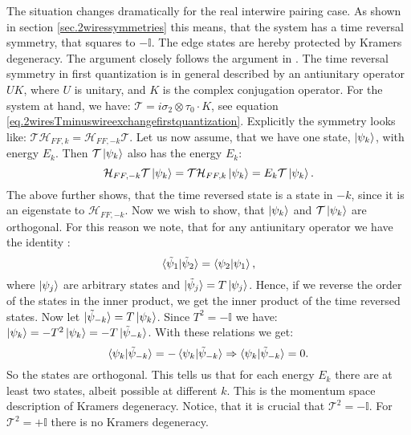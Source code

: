 The situation changes dramatically for the real interwire pairing case. As shown in section \ref{sec.2wiressymmetries} this means, that the system has a time reversal symmetry, that squares to $-\mathbb{I}$. The edge states are hereby protected by Kramers degeneracy. The argument closely follows the argument in \cite{BernevigTITSC}. The time reversal symmetry in first quantization is in general described by an antiunitary operator $UK$, where $U$ is unitary, and $K$ is the complex conjugation operator. For the system at hand, we have: $\mathcal{T} = i\sigma_2\otimes \tau_0\cdot K$, see equation \eqref{eq.2wiresTminuswireexchangefirstquantization}. Explicitly the symmetry looks like: $\mathcal{T}\mathcal{H}_{FF,k} = \mathcal{H}_{FF,-k}\mathcal{T}$. Let us now assume, that we have one state, $\ket{\psi_k}$, with energy $E_k$. Then $\mathcal{T}\ket{\psi_k}$ also has the energy $E_k$:
\begin{equation}
\mathcal{H}_{FF,-k}\mathcal{T}\ket{\psi_k} = \mathcal{T}\mathcal{H}_{FF,k}\ket{\psi_k} = E_k\mathcal{T}\ket{\psi_k}. \nonumber
\end{equation}
The above further shows, that the time reversed state is a state in $-k$, since it is an eigenstate to $\mathcal{H}_{FF,-k}$. Now we wish to show, that $\ket{\psi_k}$ and $\mathcal{T}\ket{\psi_k}$ are orthogonal. For this reason we note, that for any antiunitary operator we have the identity \cite{Sakurai, BernevigTITSC}:
\begin{equation}
\braket{\tilde{\psi}_1| \tilde{\psi}_2} = \braket{\psi_2|\psi_1}, \nonumber
\end{equation} 
where $\ket{\psi_j}$ are arbitrary states and $\ket{\tilde{\psi}_j} = T\ket{\psi_j}$. Hence, if we reverse the order of the states in the inner product, we get the inner product of the time reversed states. Now let $\ket{\tilde{\psi}_{-k}} = T\ket{\psi_k}$. Since $T^2 = - \mathbb{I}$ we have: $\ket{\psi_k} = -T^2\ket{\psi_k}= -T\ket{\tilde{\psi}_{-k}}$. With these relations we get:
\begin{equation}
\braket{\psi_k|\tilde{\psi}_{-k}} = -\braket{\psi_k|\tilde{\psi}_{-k}} \Rightarrow \braket{\psi_k|\tilde{\psi}_{-k}} = 0. 
\end{equation}
So the states are orthogonal. This tells us that for each energy $E_k$ there are at least two states, albeit possible at different $k$. This is the momentum space description of Kramers degeneracy. Notice, that it is crucial that $\mathcal{T}^2 = -\mathbb{I}$. For $\mathcal{T}^2 = +\mathbb{I}$ there is no Kramers degeneracy. 

